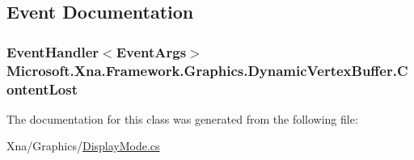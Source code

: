 \subsection{Event Documentation}
\hypertarget{class_microsoft_1_1_xna_1_1_framework_1_1_graphics_1_1_dynamic_vertex_buffer_a19c7a5af8075cbcb2f26051a872816df}{}
\subsubsection[{Content\+Lost}]{\setlength{\rightskip}{0pt plus 5cm}Event\+Handler$<$Event\+Args$>$ Microsoft.\+Xna.\+Framework.\+Graphics.\+Dynamic\+Vertex\+Buffer.\+Content\+Lost}\label{class_microsoft_1_1_xna_1_1_framework_1_1_graphics_1_1_dynamic_vertex_buffer_a19c7a5af8075cbcb2f26051a872816df}


The documentation for this class was generated from the following file\+:\begin{DoxyCompactItemize}
\item 
Xna/\+Graphics/\hyperlink{_display_mode_8cs}{Display\+Mode.\+cs}\end{DoxyCompactItemize}
